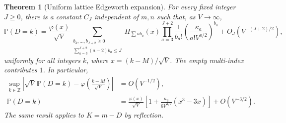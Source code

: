 \documentclass[11pt,letterpaper]{article}
\numberwithin{equation}{subsection}
\newtheorem{theorem}{Theorem}[subsection]
\theoremstyle{definition}
\theoremstyle{remark}
\theoremstyle{plain}
\newcommand{\Prob}{\mathbb P}
\begin{document}
\begin{theorem}[Uniform lattice Edgeworth expansion]\label{a122:pd:thm:edgeworth}
For every fixed integer $J\ge0$, there is a constant $C_J$ independent
of $m,n$ such that, as $V\to\infty$,
\begin{equation}\label{a122:pd:eq:edgeworth}
 \Prob(D=k)=\frac{\varphi(x)}{\sqrt V}
 \sum_{\substack{b_3,\ldots,b_{J+2}\ge0\\
              \sum_{a=3}^{J+2}(a-2)b_a\le J}}
 H_{\sum a b_a}(x)
 \prod_{a=3}^{J+2}\frac1{b_a!}
 \left(\frac{\kappa_a}{a! V^{a/2}}\right)^{b_a}
 +O_J\!\left(V^{-(J+2)/2}\right),
\end{equation}
uniformly for all integers $k$, where $x=(k-M)/\sqrt V$.
The empty multi-index contributes $1$. In particular,
\begin{align}
 \sup_{k\in\mathbb Z}\left|
 \sqrt V\,\Prob(D=k)-\varphi\!\left(\frac{k-M}{\sqrt V}\right)
 \right|&=O(V^{-1/2}),\label{a122:pd:eq:lclt}\\
 \Prob(D=k)&=\frac{\varphi(x)}{\sqrt V}
 \left[1+\frac{\kappa_3}{6V^{3/2}}(x^3-3x)\right]
 +O(V^{-3/2}).\label{a122:pd:eq:firstedge}
\end{align}
The same result applies to $K=m-D$ by reflection.
\end{theorem}
\end{document}
